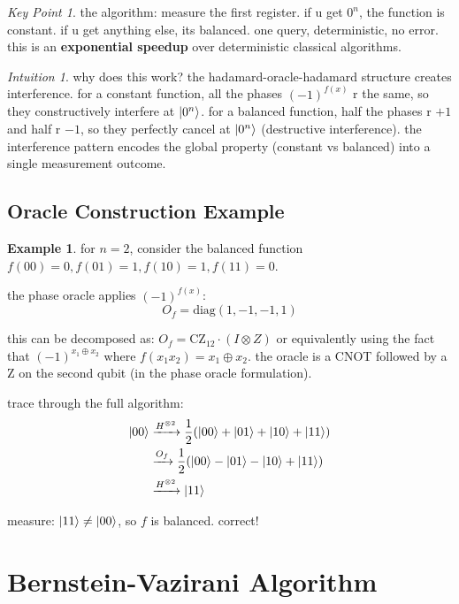 \documentclass[11pt,a4paper]{article}
\theoremstyle{definition}
\newtheorem{example}{Example}[section]
\theoremstyle{remark}
\newtheorem*{intuition}{Intuition}
\newtheorem*{keypoint}{Key Point}
\begin{document}
\begin{keypoint}
the algorithm: measure the first register. if u get $0^n$, the function is constant. if u get anything else, its balanced. one query, deterministic, no error. this is an \textbf{exponential speedup} over deterministic classical algorithms.
\end{keypoint}

\begin{intuition}
why does this work? the hadamard-oracle-hadamard structure creates interference. for a constant function, all the phases $(-1)^{f(x)}$ r the same, so they constructively interfere at $\ket{0^n}$. for a balanced function, half the phases r $+1$ and half r $-1$, so they perfectly cancel at $\ket{0^n}$ (destructive interference). the interference pattern encodes the global property (constant vs balanced) into a single measurement outcome.
\end{intuition}

\subsection{Oracle Construction Example}

\begin{example}
for $n = 2$, consider the balanced function $f(00) = 0, f(01) = 1, f(10) = 1, f(11) = 0$.

the phase oracle applies $(-1)^{f(x)}$:
\[
O_f = \text{diag}(1, -1, -1, 1)
\]

this can be decomposed as: $O_f = \text{CZ}_{12} \cdot (I \otimes Z)$ or equivalently using the fact that $(-1)^{x_1 \oplus x_2}$ where $f(x_1 x_2) = x_1 \oplus x_2$. the oracle is a CNOT followed by a Z on the second qubit (in the phase oracle formulation).

trace through the full algorithm:
\begin{align}
\ket{00} &\xrightarrow{H^{\otimes 2}} \frac{1}{2}(\ket{00} + \ket{01} + \ket{10} + \ket{11}) \\
&\xrightarrow{O_f} \frac{1}{2}(\ket{00} - \ket{01} - \ket{10} + \ket{11}) \\
&\xrightarrow{H^{\otimes 2}} \ket{11}
\end{align}

measure: $\ket{11} \neq \ket{00}$, so $f$ is balanced. correct!
\end{example}

\section{Bernstein-Vazirani Algorithm}
\end{document}

